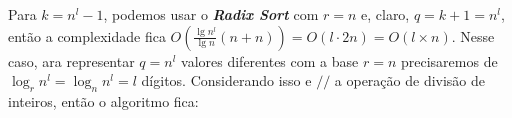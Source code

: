 Para $k = n^l - 1$, podemos usar o \textbf{\textit{Radix Sort}} com $r = n$ e, claro, $q = k + 1 = n^l$, então a complexidade fica
$O\left(\frac{\lg n^l}{\lg n}(n + n)\right) = O(l \cdot 2n) = O(l \times n)$. Nesse caso, ara representar $q = n^l$ valores diferentes com a
base $r = n$ precisaremos de $\log_r n^l = \log_n n^l = l$ dígitos. Considerando isso e $//$ a operação de divisão de inteiros, então o algoritmo fica: